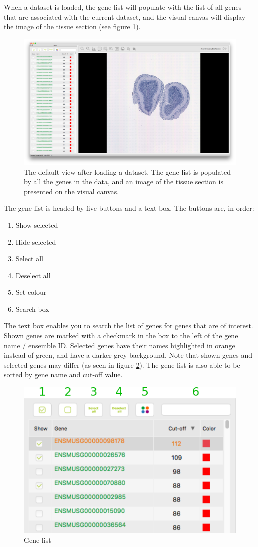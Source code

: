 \documentclass[10pt,a4paper,titlepage]{book}
\begin{document}
When a dataset is loaded, the gene list will populate with the list of all genes that are associated with the current dataset, and the visual canvas will display the image of the tissue section (see figure \ref{fig:default_loaded_data}). 
\begin{figure}[h]
	\centering
	\includegraphics[width=0.9\linewidth]{./Pictures/default_dataset_loaded}
	\caption[Default view after loading a dataset]{The default view after loading a dataset. The gene list is populated by all the genes in the data, and an image of the tissue section is presented on the visual canvas.}
	\label{fig:default_loaded_data}
\end{figure}

The gene list is headed by five buttons and a text box. The buttons are, in order:
\begin{enumerate}
\item	Show selected
\item	Hide selected
\item	Select all
\item	Deselect all
\item	Set colour
\item	Search box
\end{enumerate}

The text box enables you to search the list of genes for genes that are of interest. Shown genes are marked with a checkmark in the box to the left of the gene name / ensemble ID. Selected genes have their names highlighted in orange instead of green, and have a darker grey background. Note that shown genes and selected genes may differ (as seen in figure \ref{fig:gene_list}). The gene list is also able to be sorted by gene name and cut-off value.

\begin{figure}[h]
	\centering
	\includegraphics[scale=0.7]{./Pictures/gene_list}
	\caption[Gene List]{Gene list}
	\label{fig:gene_list}
\end{figure}
\end{document}
